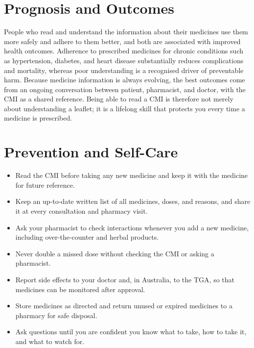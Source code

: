 \section*{Prognosis and Outcomes}
People who read and understand the information about their medicines use them more safely and adhere to them better, and both are associated with improved health outcomes. Adherence to prescribed medicines for chronic conditions such as hypertension, diabetes, and heart disease substantially reduces complications and mortality, whereas poor understanding is a recognised driver of preventable harm. Because medicine information is always evolving, the best outcomes come from an ongoing conversation between patient, pharmacist, and doctor, with the CMI as a shared reference. Being able to read a CMI is therefore not merely about understanding a leaflet; it is a lifelong skill that protects you every time a medicine is prescribed.

\section*{Prevention and Self-Care}
\begin{itemize}
    \item Read the CMI before taking any new medicine and keep it with the medicine for future reference.
    \item Keep an up-to-date written list of all medicines, doses, and reasons, and share it at every consultation and pharmacy visit.
    \item Ask your pharmacist to check interactions whenever you add a new medicine, including over-the-counter and herbal products.
    \item Never double a missed dose without checking the CMI or asking a pharmacist.
    \item Report side effects to your doctor and, in Australia, to the TGA, so that medicines can be monitored after approval.
    \item Store medicines as directed and return unused or expired medicines to a pharmacy for safe disposal.
    \item Ask questions until you are confident you know what to take, how to take it, and what to watch for.
\end{itemize}


